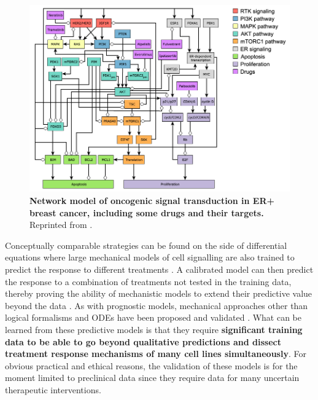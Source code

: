 \documentclass[a4paper,12pt,twoside,onecolumn,openright,final,oldfontcommands]{memoir}
\begin{document}
\begin{figure}

{\centering \includegraphics[width=0.9\linewidth]{fig/netdrug} 

}

\caption[Network model of oncogenic signal transduction in ER+ breast cancer, including some drugs and their targets]{\textbf{Network model of oncogenic signal
transduction in ER+ breast cancer, including some drugs and their
targets.} Reprinted from \citet{zanudo2017network}.}\label{fig:netdrug}
\end{figure}





Conceptually comparable strategies can be found on the side of
differential equations where large mechanical models of cell signalling
are also trained to predict the response to different treatments
\citep{bouhaddou2018mechanistic, frohlich2018efficient}. A calibrated
model can then predict the response to a combination of treatments not
tested in the training data, thereby proving the ability of mechanistic
models to extend their predictive value beyond the data
\citep{frohlich2018efficient}. As with prognostic models, mechanical
approaches other than logical formalisms and ODEs have been proposed and
validated \citep{jastrzebski2018integrative}. What can be learned from
these predictive models is that they require \textbf{significant
training data to be able to go beyond qualitative predictions and
dissect treatment response mechanisms of many cell lines
simultaneously}. For obvious practical and ethical reasons, the
validation of these models is for the moment limited to preclinical data
since they require data for many uncertain therapeutic interventions.
\end{document}
